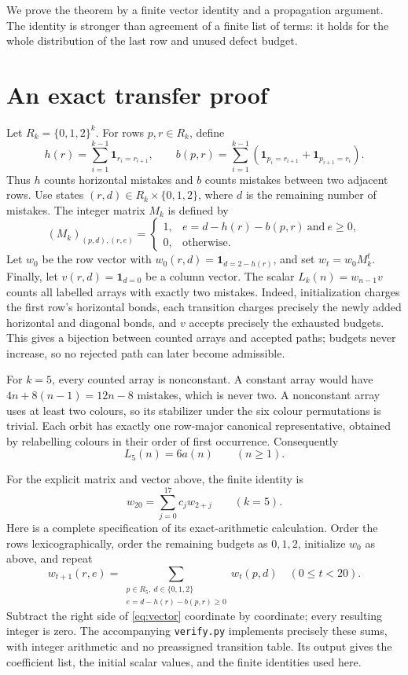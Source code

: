 \documentclass[11pt]{article}
\newcommand{\ind}{\mathbf{1}}
\begin{document}
We prove the theorem by a finite vector identity and a propagation
argument. The identity is stronger than agreement of a finite list of
terms: it holds for the whole distribution of the last row and unused
defect budget.

\section{An exact transfer proof}
Let $R_k=\{0,1,2\}^k$. For rows $p,r\in R_k$, define
\[
h(r)=\sum_{i=1}^{k-1}\ind_{r_i=r_{i+1}},\qquad
b(p,r)=\sum_{i=1}^{k-1}
  (\ind_{p_i=r_{i+1}}+\ind_{p_{i+1}=r_i}).
\]
Thus $h$ counts horizontal mistakes and $b$ counts mistakes between
two adjacent rows. Use states $(r,d)\in R_k\times\{0,1,2\}$, where $d$
is the remaining number of mistakes. The integer matrix $M_k$ is
defined by
\[
(M_k)_{(p,d),(r,e)}=
\begin{cases}
1,&e=d-h(r)-b(p,r)\ \text{and}\ e\geq0,\\
0,&\text{otherwise}.
\end{cases}
\]
Let $w_0$ be the row vector with
$w_0(r,d)=\ind_{d=2-h(r)}$, and set $w_t=w_0M_k^t$.
Finally, let $v(r,d)=\ind_{d=0}$ be a column vector.
The scalar $L_k(n)=w_{n-1}v$ counts all labelled arrays with exactly
two mistakes. Indeed, initialization charges the first row's horizontal
bonds, each transition charges precisely the newly added horizontal and
diagonal bonds, and $v$ accepts precisely the exhausted budgets.
This gives a bijection between counted arrays and accepted paths;
budgets never increase, so no rejected path can later become admissible.

For $k=5$, every counted array is nonconstant. A constant array would
have $4n+8(n-1)=12n-8$ mistakes, which is never two.
A nonconstant array uses at least two colours, so its stabilizer under
the six colour permutations is trivial. Each orbit has exactly one
row-major canonical representative, obtained by relabelling colours
in their order of first occurrence. Consequently
\begin{equation}\label{eq:orbit}
L_5(n)=6a(n)\qquad(n\geq1).
\end{equation}

For the explicit matrix and vector above, the finite identity is
\begin{equation}\label{eq:vector}
w_{20}=\sum_{j=0}^{17}c_j w_{2+j}\qquad(k=5).
\end{equation}
Here is a complete specification of its exact-arithmetic calculation.
Order the rows lexicographically, order the remaining budgets as $0,1,2$,
initialize $w_0$ as above, and repeat
\[
w_{t+1}(r,e)=
\sum_{\substack{p\in R_5,\ d\in\{0,1,2\}\\
 e=d-h(r)-b(p,r)\geq0}} w_t(p,d)
\quad(0\leq t<20).
\]
Subtract the right side of \eqref{eq:vector} coordinate by coordinate;
every resulting integer is zero. The accompanying \texttt{verify.py}
implements precisely these sums, with integer arithmetic and no
preassigned transition table. Its output gives the coefficient list,
the initial scalar values, and the finite identities used here.
\end{document}

